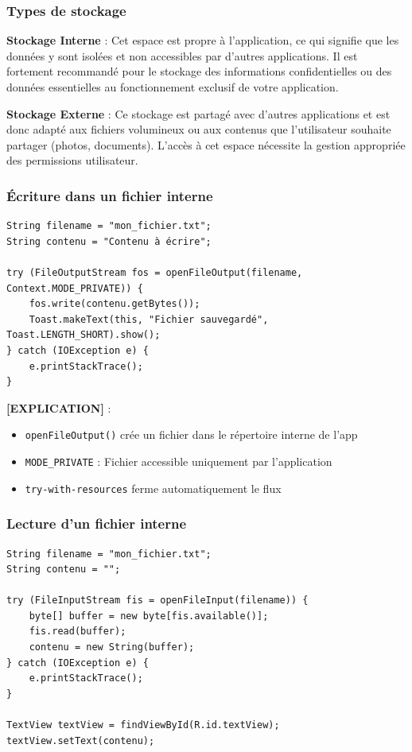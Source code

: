 \documentclass[11pt,a4paper]{article}
\begin{document}
\subsubsection{Types de stockage}

\textbf{Stockage Interne} : Cet espace est propre à l'application, ce qui signifie que les données y sont isolées et non accessibles par d'autres applications. Il est fortement recommandé pour le stockage des informations confidentielles ou des données essentielles au fonctionnement exclusif de votre application.

\textbf{Stockage Externe} : Ce stockage est partagé avec d'autres applications et est donc adapté aux fichiers volumineux ou aux contenus que l'utilisateur souhaite partager (photos, documents). L'accès à cet espace nécessite la gestion appropriée des permissions utilisateur.

\subsubsection{Écriture dans un fichier interne}

\begin{lstlisting}
String filename = "mon_fichier.txt";
String contenu = "Contenu à écrire";

try (FileOutputStream fos = openFileOutput(filename, Context.MODE_PRIVATE)) {
    fos.write(contenu.getBytes());
    Toast.makeText(this, "Fichier sauvegardé", Toast.LENGTH_SHORT).show();
} catch (IOException e) {
    e.printStackTrace();
}
\end{lstlisting}

\textbf{[EXPLICATION]} :
\begin{itemize}
    \item \texttt{openFileOutput()} crée un fichier dans le répertoire interne de l'app
    \item \texttt{MODE\_PRIVATE} : Fichier accessible uniquement par l'application
    \item \texttt{try-with-resources} ferme automatiquement le flux
\end{itemize}

\subsubsection{Lecture d'un fichier interne}

\begin{lstlisting}
String filename = "mon_fichier.txt";
String contenu = "";

try (FileInputStream fis = openFileInput(filename)) {
    byte[] buffer = new byte[fis.available()];
    fis.read(buffer);
    contenu = new String(buffer);
} catch (IOException e) {
    e.printStackTrace();
}

TextView textView = findViewById(R.id.textView);
textView.setText(contenu);
\end{lstlisting}
\end{document}
